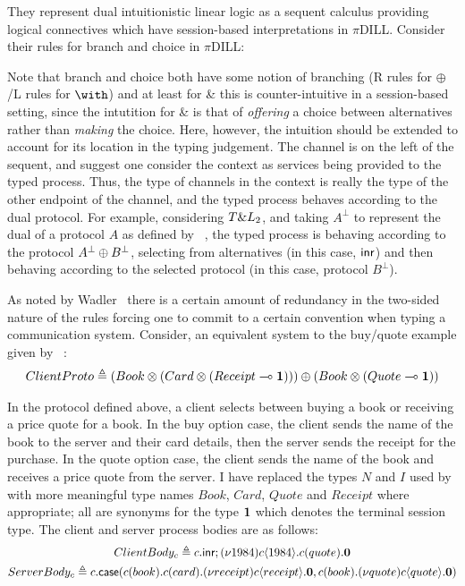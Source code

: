 \documentclass{mprop}
\begin{document}
They represent dual intuitionistic linear logic as a sequent calculus
providing logical connectives which have session-based interpretations in
$\pi$DILL. Consider their rules for branch and choice in $\pi$DILL:


Note that branch and choice both have some notion of branching (R rules for
$\oplus$/L rules for $\with$) and at least for \& this is counter-intuitive in
a session-based setting, since the intutition for \& is that of
\emph{offering} a choice between alternatives rather than \emph{making} the
choice. Here, however, the intuition should be extended to account for its
location in the typing judgement. The channel is on the left of the sequent,
and \citeauthor{Caires:2010:STI} suggest one consider the context as services
being provided to the typed process. Thus, the type of channels in the context
is really the type of the other endpoint of the channel, and the typed process
behaves according to the dual protocol. For example, considering
$T \& L_2$, and taking $A^\bot$ to represent the dual of a protocol $A$
as defined by \citeauthor{Wadler:2014}~\cite{Wadler:2014}, the typed process
is behaving according to the protocol ${A^\bot}\oplus{B^\bot}$, selecting
from alternatives (in this case, $\mathsf{inr}$) and then behaving according to
the selected protocol (in this case, protocol $B^\bot$).

As noted by Wadler~\cite{Wadler:2014} there is a certain amount of redundancy
in the two-sided nature of the rules forcing one to commit to a certain
convention when typing a communication system. Consider, an equivalent system
to the buy/quote example given by
\citeauthor{Caires:2010:STI}~\cite[\S~3]{Caires:2010:STI}:
\begin{gather*}
{ClientProto}\triangleq{{({Book}\otimes{({Card}\otimes{({Receipt}\multimap{\mathbf{1}})})})}\oplus{({Book}\otimes{({Quote}\multimap{\mathbf{1}})})}}
\end{gather*}

In the protocol defined above, a client selects between buying a book or
receiving a price quote for a book. In the buy option case, the client sends
the name of the book to the server and their card details, then the server
sends the receipt for the purchase. In the quote option case, the client sends
the name of the book and receives a price quote from the server. I have
replaced the types $N$ and $I$ used by \citeauthor{Caires:2010:STI} with more
meaningful type names $Book$, $Card$, $Quote$ and $Receipt$ where appropriate;
all are synonyms for the type $\mathbf{1}$ which denotes the terminal session
type. The client and server process bodies are as follows:
\begin{gather*}
{ClientBody_c}\triangleq{{c}.\mathsf{inr};{(\nu{1984}){c}\langle{1984}\rangle.{{c}({quote}).{\mathbf{0}}}}}\\
{ServerBody_c}\triangleq{{c}.\mathsf{case}({{c}({book}).{{c}({card}).{(\nu{receipt}){c}\langle{receipt}\rangle.{\mathbf{0}}}}},{{c}({book}).{(\nu{quote}){c}\langle{quote}\rangle.{\mathbf{0}}}})}
\end{gather*}
\end{document}
